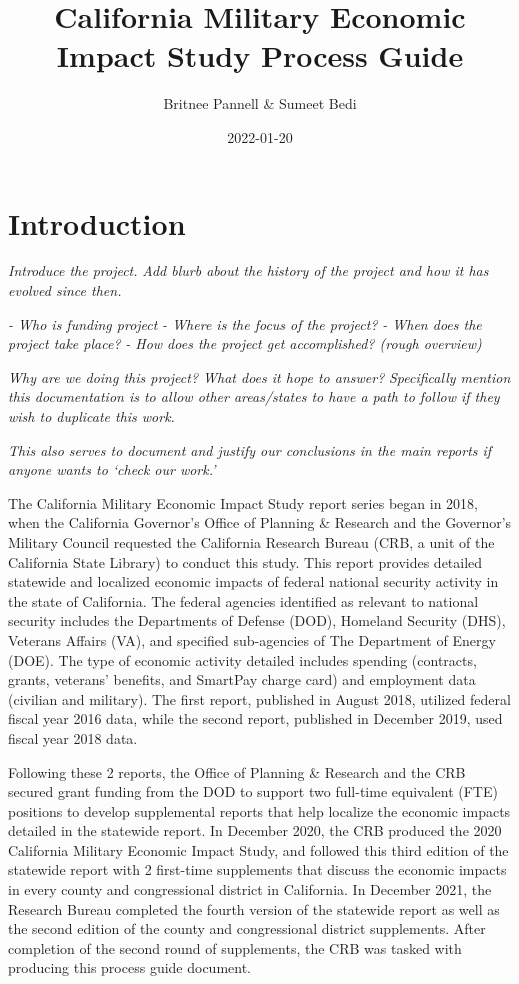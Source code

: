 \documentclass[
]{book}
\title{California Military Economic Impact Study Process Guide}
\author{Britnee Pannell \& Sumeet Bedi}
\date{2022-01-20}
\begin{document}
\maketitle

{
\setcounter{tocdepth}{1}
\tableofcontents
}
\hypertarget{introduction}{%
\chapter{Introduction}\label{introduction}}

\emph{Introduce the project.}
\emph{Add blurb about the history of the project and how it has evolved since then.}

\emph{- Who is funding project}
\emph{- Where is the focus of the project?}
\emph{- When does the project take place?}
\emph{- How does the project get accomplished? (rough overview)}

\emph{Why are we doing this project? What does it hope to answer?}
\emph{Specifically mention this documentation is to allow other areas/states to have a path to follow if they wish to duplicate this work.}

\emph{This also serves to document and justify our conclusions in the main reports if anyone wants to `check our work.'}

The California Military Economic Impact Study report series began in 2018, when the California Governor's Office of Planning \& Research and the Governor's Military Council requested the California Research Bureau (CRB, a unit of the California State Library) to conduct this study. This report provides detailed statewide and localized economic impacts of federal national security activity in the state of California. The federal agencies identified as relevant to national security includes the Departments of Defense (DOD), Homeland Security (DHS), Veterans Affairs (VA), and specified sub-agencies of The Department of Energy (DOE). The type of economic activity detailed includes spending (contracts, grants, veterans' benefits, and SmartPay charge card) and employment data (civilian and military). The first report, published in August 2018, utilized federal fiscal year 2016 data, while the second report, published in December 2019, used fiscal year 2018 data.

Following these 2 reports, the Office of Planning \& Research and the CRB secured grant funding from the DOD to support two full-time equivalent (FTE) positions to develop supplemental reports that help localize the economic impacts detailed in the statewide report. In December 2020, the CRB produced the 2020 California Military Economic Impact Study, and followed this third edition of the statewide report with 2 first-time supplements that discuss the economic impacts in every county and congressional district in California. In December 2021, the Research Bureau completed the fourth version of the statewide report as well as the second edition of the county and congressional district supplements. After completion of the second round of supplements, the CRB was tasked with producing this process guide document.
\end{document}
